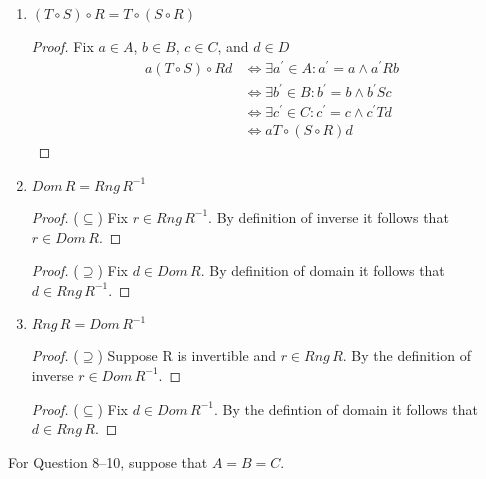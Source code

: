 \documentclass{article}
\begin{document}
\begin{enumerate}
\begin{proof}
      \end{proof}
    \item $(T \circ S) \circ R = T \circ (S \circ R)$
      \begin{proof}
        Fix $a\in A$, $b\in B$, $c\in C$, and $d\in D$
        \begin{align*}
          a(T\circ S)\circ Rd &\iff \exists a^{'}\in A: a^{'}=a \wedge a^{'}Rb \\
          &\iff \exists b^{'}\in B: b^{'}=b \wedge b^{'}Sc \\
          &\iff \exists c^{'}\in C: c^{'}=c \wedge c^{'}Td \\
          &\iff aT\circ(S\circ R)d
        \end{align*}
      \end{proof}
    \item $Dom\,R = Rng\,R^{-1}$
      \begin{proof} ($\subseteq$)
        Fix $r\in Rng\,R^{-1}$. By definition of inverse it follows that $r\in Dom\,R$.
      \end{proof}
      \begin{proof} ($\supseteq$)
Fix $d\in Dom\,R$. By definition of domain it follows that $d \in Rng\,R^{-1}$.
      \end{proof}
    \item $Rng\,R = Dom\,R^{-1}$
      \begin{proof} ($\supseteq$)
        Suppose R is invertible and $r\in Rng\,R$. By the definition of inverse $r\in Dom\,R^{-1}$.
      \end{proof}
      \begin{proof} ($\subseteq$)
Fix $d\in Dom\,R^{-1}$. By the defintion of domain it follows that $d\in Rng\,R$.
      \end{proof}
  \end{enumerate}
  For Question 8–10, suppose that $A = B = C$.
\end{document}
